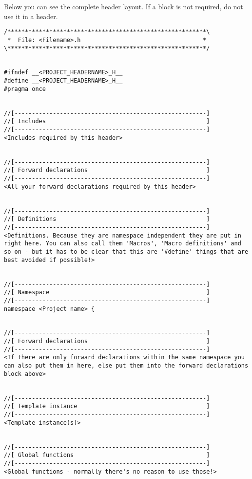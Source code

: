 Below you can see the complete header layout. If a block is not required, do not use it in a header.

\begin{lstlisting}[caption=Complete header layout]
/*********************************************************\
 *  File: <Filename>.h                                   *
\*********************************************************/


#ifndef __<PROJECT_HEADERNAME>_H__
#define __<PROJECT_HEADERNAME>_H__
#pragma once


//[-------------------------------------------------------]
//[ Includes                                              ]
//[-------------------------------------------------------]
<Includes required by this header>


//[-------------------------------------------------------]
//[ Forward declarations                                  ]
//[-------------------------------------------------------]
<All your forward declarations required by this header>


//[-------------------------------------------------------]
//[ Definitions                                           ]
//[-------------------------------------------------------]
<Definitions. Because they are namespace independent they are put in right here. You can also call them 'Macros', 'Macro definitions' and so on - but it has to be clear that this are '#define' things that are best avoided if possible!>


//[-------------------------------------------------------]
//[ Namespace                                             ]
//[-------------------------------------------------------]
namespace <Project name> {


//[-------------------------------------------------------]
//[ Forward declarations                                  ]
//[-------------------------------------------------------]
<If there are only forward declarations within the same namespace you can also put them in here, else put them into the forward declarations block above>


//[-------------------------------------------------------]
//[ Template instance                                     ]
//[-------------------------------------------------------]
<Template instance(s)>


//[-------------------------------------------------------]
//[ Global functions                                      ]
//[-------------------------------------------------------]
<Global functions - normally there's no reason to use those!>



\end{lstlisting}
